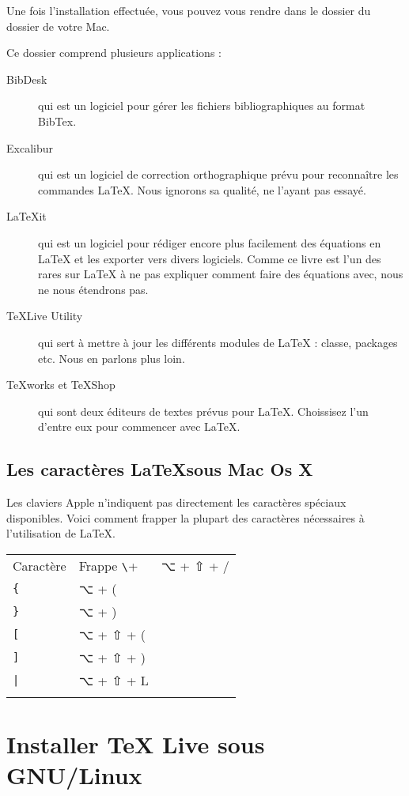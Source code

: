 Une fois l'installation effectuée, vous pouvez vous rendre dans le dossier  du dossier  de votre Mac.

Ce dossier comprend plusieurs applications :
\begin{description}
\item[BibDesk] qui est un logiciel pour gérer les fichiers bibliographiques au format BibTex.
\item[Excalibur] qui est un logiciel de correction orthographique prévu pour reconnaître les commandes \LaTeX{}. Nous ignorons sa qualité, ne l'ayant pas essayé.
\item[LaTeXit] qui est un logiciel pour rédiger encore plus facilement des équations en \LaTeX{} et les exporter vers divers logiciels. Comme ce livre est l'un des rares sur \LaTeX{} à ne pas expliquer comment faire des équations avec, nous ne nous étendrons pas.
\item[TeXLive Utility] qui sert à mettre à jour les différents modules de \LaTeX{} : classe, packages etc. Nous en parlons plus loin. 
\item[TeXworks et TeXShop] qui sont deux éditeurs de textes prévus pour \LaTeX. Choissisez l'un d'entre eux pour commencer avec \LaTeX{}.
\end{description}

\subsection{Les caractères \LaTeX sous Mac Os X}\label{claviermac}

Les claviers Apple n'indiquent pas directement les caractères spéciaux disponibles. Voici comment frapper la plupart des caractères nécessaires à l'utilisation de \LaTeX.

\begin{longtable}{|ll|}
\hline
Caractère & Frappe
\hline
\endhead
\hline
\verb+\+ & ⌥ + ⇧ + / \\
\verb+{+ & ⌥ + (\\
\verb+}+ & ⌥ + )\\
\verb+[+ & ⌥ + ⇧ + ( \\
\verb+]+ & ⌥ + ⇧ + ) \\
\verb+|+ & ⌥ + ⇧ + L  \\
\endfoot
\end{longtable}
\section{Installer TeX Live sous GNU/Linux}

